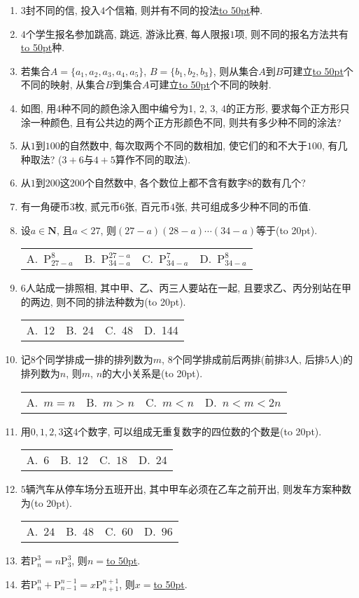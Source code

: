 \documentclass[10pt,a4paper]{article}
\newcommand{\blank}[1]{\underline{\hbox to #1pt{}}}
\newcommand{\bracket}[1]{(\hbox to #1pt{})}
\newcommand{\fourch}[4]{\par\begin{tabular}{p{.23\textwidth}p{.23\textwidth}p{.23\textwidth}p{.23\textwidth}}
A.~#1 &B.~#2& C.~#3& D.~#4
\end{tabular}}
\begin{document}
\begin{enumerate}[1.]
\fourch{$9$种}{$12$种}{$16$种}{$24$种}
\item $3$封不同的信, 投入$4$个信箱, 则并有不同的投法\blank{50}种.
\item $4$个学生报名参加跳高, 跳远, 游泳比赛, 每人限报$1$项, 则不同的报名方法共有\blank{50}种.
\item 若集合$A=\{a_1,a_2,a_3,a_4,a_5\}$, $B=\{b_1,b_2,b_3\}$, 则从集合$A$到$B$可建立\blank{50}个不同的映射, 从集合$B$到集合$A$可建立\blank{50}个不同的映射.
\item 如图, 用4种不同的颜色涂入图中编兮为1, 2, 3, 4的正方形, 要求每个正方形只涂一种颜色, 且有公共边的两个正方形颜色不同, 则共有多少种不同的涂法?
\begin{center}
\end{center}
\item 从$1$到$100$的自然数中, 每次取两个不同的数相加, 使它们的和不大于$100$, 有几种取法? ($3+6$与$4+5$算作不同的取法).
\item 从$1$到$200$这$200$个自然数中, 各个数位上都不含有数字$8$的数有几个?
\item 有一角硬币$3$枚, 贰元币$6$张, 百元币$4$张, 共可组成多少种不同的币值.
\item 设$a\in \mathbf{N}$, 且$a<27$, 则$(27-a)(28-a)\cdots (34-a)$等于\bracket{20}.
\fourch{$\mathrm{P}_{27-a}^8$}{$\mathrm{P}_{34-a}^{27-a}$}{$\mathrm{P}_{34-a}^7$}{$\mathrm{P}_{34-a}^8$}
\item $6$人站成一排照相, 其中甲、乙、丙三人要站在一起, 且要求乙、丙分别站在甲的两边, 则不同的排法种数为\bracket{20}.
\fourch{12}{24}{48}{144}
\item 记$8$个同学排成一排的排列数为$m$, $8$个同学排成前后两排(前排$3$人, 后排$5$人)的排列数为$n$, 则$m$, $n$的大小关系是\bracket{20}.
\fourch{$m=n$}{$m>n$}{$m<n$}{$n<m<2n$}
\item 用$0, 1, 2, 3$这$4$个数字, 可以组成无重复数字的四位数的个数是\bracket{20}.
\fourch{$6$}{$12$}{$18$}{$24$}
\item $5$辆汽车从停车场分五班开出, 其中甲车必须在乙车之前开出, 则发车方案种数为\bracket{20}.
\fourch{$24$}{$48$}{$60$}{$96$}
\item 若$\mathrm{P}_n^3=n\mathrm{P}_3^3$, 则$n=$\blank{50}.
\item 若$\mathrm{P}_n^n+\mathrm{P}_{n-1}^{n-1}=x\mathrm{P}_{n+1}^{n+1}$, 则$x=$\blank{50}.

\end{enumerate}
\end{document}
